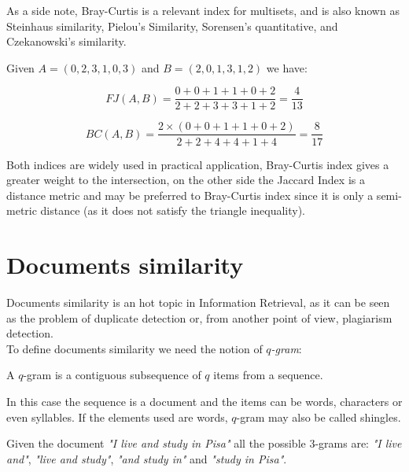 As a side note, Bray-Curtis is a relevant index for multisets, and is also known as Steinhaus similarity, Pielou's Similarity, Sorensen's quantitative, and Czekanowski's similarity.

\begin{esempio}
	Given $A = (0, 2, 3, 1, 0, 3) $ and $B = (2, 0, 1, 3, 1, 2)$ we have:
	
	\begin{equation}
	FJ(A,B) = \frac{0 + 0 + 1 + 1 + 0 + 2}{2 + 2 + 3 + 3 + 1 + 2} = \frac{4}{13} 
	\end{equation}
	
	\begin{equation}
	BC(A,B) = \frac{2 \times (0 + 0 + 1 + 1 + 0 + 2) }{2 + 2 + 4 + 4 + 1 + 4} = \frac{8}{17}
	\end{equation}
\end{esempio}


Both indices are widely used in practical application, Bray-Curtis index gives a greater weight to the intersection, on the other side the Jaccard Index is a distance metric and may be preferred to Bray-Curtis index since it is only a semi-metric distance (as it does not satisfy the triangle inequality). 


\section{Documents similarity}

Documents similarity is an hot topic in Information Retrieval, as it can be seen as the problem of duplicate detection or, from another point of view, plagiarism detection.\\

To define documents similarity we need the notion of \textit{$q$-gram}:

\begin{definizione}
	A $q$-gram is a contiguous subsequence of $q$ items from a sequence.
\end{definizione}

In this case the sequence is a document and the items can be words, characters or even syllables. If the elements used are words, $q$-gram may also be called shingles.

\begin{esempio}
	Given the document \textit{"I live and study in Pisa"} all the possible $3$-grams are: 
	\textit{"I live and"}, \textit{"live and study"}, \textit{"and study in"} and \textit{"study in Pisa"}.
\end{esempio}

